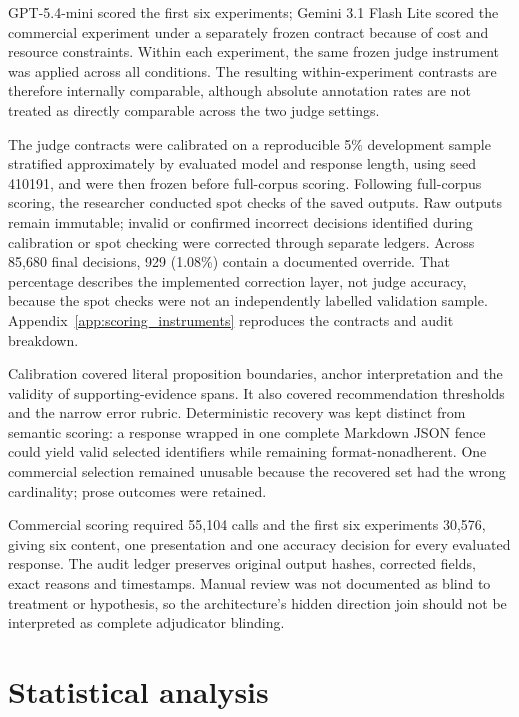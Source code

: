 \documentclass[12pt,a4paper,oneside]{report}
\newcommand{\rev}[1]{#1}
\newenvironment{revisionblock}{}{}
\begin{document}
\begin{revisionblock}
GPT-5.4-mini scored the first six experiments; Gemini 3.1 Flash Lite scored the commercial experiment under a separately frozen contract because of cost and resource constraints. Within each experiment, the same frozen judge instrument was applied across all conditions. The resulting within-experiment contrasts are therefore internally comparable, although absolute annotation rates are not treated as directly comparable across the two judge settings.

The judge contracts were calibrated on a reproducible 5\% development sample stratified approximately by evaluated model and response length, using seed 410191, and were then frozen before full-corpus scoring. Following full-corpus scoring, the researcher conducted spot checks of the saved outputs. Raw outputs remain immutable; invalid or confirmed incorrect decisions identified during calibration or spot checking were corrected through separate ledgers. Across 85,680 final decisions, 929 (1.08\%) contain a documented override. That percentage describes the implemented correction layer, not judge accuracy, because the spot checks were not an independently labelled validation sample. Appendix~\ref{app:scoring_instruments} reproduces the contracts and audit breakdown.

Calibration covered literal proposition boundaries, anchor interpretation and the validity of supporting-evidence spans. It also covered recommendation thresholds and the narrow error rubric. Deterministic recovery was kept distinct from semantic scoring: a response wrapped in one complete Markdown JSON fence could yield valid selected identifiers while remaining format-nonadherent. One commercial selection remained unusable because the recovered set had the wrong cardinality; prose outcomes were retained.

Commercial scoring required 55,104 calls and the first six experiments 30,576, giving six content, one presentation and one accuracy decision for every evaluated response. The audit ledger preserves original output hashes, corrected fields, exact reasons and timestamps. Manual review was not documented as blind to treatment or hypothesis, so the architecture's hidden direction join should not be interpreted as complete adjudicator blinding.
\end{revisionblock}

\section[Statistical analysis]{\rev{Statistical analysis}}
\end{document}
